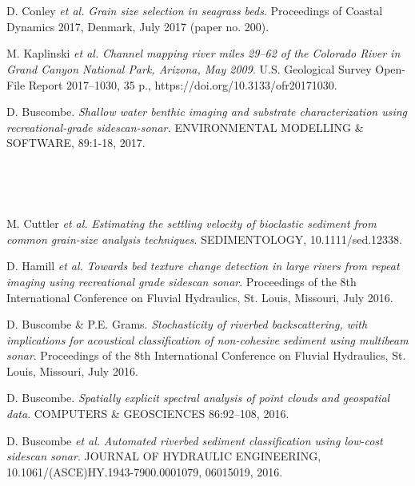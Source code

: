 \documentclass{article} %
\def\sf{\sffamily}
\def\sl{\slshape}
\newlength\sidebarwidth
\newcommand{\subtopic}[3][]
	 {\begin{minipage}{\textwidth}
	 \vspace*{.4\baselineskip}
         \nopagebreak\hspace{0in}%
         \nopagebreak\begin{minipage}[t]{\sidebarwidth - .2cm}
         \raggedleft {\sf\fontseries{sbc}\selectfont #2}
         {\\[-0.2\baselineskip] \textcolor{gray}{\footnotesize #1}}
	 \end{minipage}%
	 \hfill
	 \begin{minipage}[t]{\linewidth - \sidebarwidth}
	 #3%
	 \end{minipage}%
	 \vspace*{.2\baselineskip plus 1\baselineskip minus
	 .2\baselineskip}%
	 \end{minipage}}
\begin{document}
\subtopic{\hspace*{-3ex} 2017}{~
  \begin{itemize}[leftmargin=0ex, itemsep=0ex, parsep=.5ex, labelindent=-4ex]

    \publication
      D. Conley {\sl et al.}
      {\sl Grain size selection in seagrass beds}.
      Proceedings of Coastal Dynamics 2017, Denmark, July 2017 (paper no. 200).

    \publication
      M. Kaplinski {\sl et al.}
      {\sl Channel mapping river miles 29–62 of the Colorado River in Grand Canyon National Park, Arizona, May 2009}.
      U.S. Geological Survey Open-File Report 2017–1030, 35 p., https://doi.org/10.3133/ofr20171030.

    \publication
      D. Buscombe.
      {\sl Shallow water benthic imaging and substrate characterization using recreational-grade sidescan-sonar.}
      ENVIRONMENTAL MODELLING \& SOFTWARE, 89:1-18, 2017.

    \end{itemize}
}


\subtopic{\hspace*{-3ex} 2016}{~
  \begin{itemize}[leftmargin=0ex, itemsep=0ex, parsep=.5ex, labelindent=-4ex]

    \publication
      M. Cuttler {\sl et al.}
      {\sl Estimating the settling velocity of bioclastic sediment from common grain-size analysis techniques}.
      SEDIMENTOLOGY, 10.1111/sed.12338.

    \publication
      D. Hamill {\sl et al.}
      {\sl Towards bed texture change detection in large rivers from repeat imaging using recreational grade sidescan sonar}.
      Proceedings of the 8th International Conference on Fluvial Hydraulics, St. Louis, Missouri, July 2016.

    \publication
      D. Buscombe \& P.E. Grams.
      {\sl Stochasticity of riverbed backscattering, with implications for acoustical classification of non-cohesive sediment using multibeam sonar}.
      Proceedings of the 8th International Conference on Fluvial Hydraulics, St. Louis, Missouri, July 2016.

    \publication
      D. Buscombe.
      {\sl Spatially explicit spectral analysis of point clouds and geospatial data}.
      COMPUTERS \& GEOSCIENCES 86:92--108, 2016.

    \publication
      D. Buscombe {\sl et al.}
      {\sl Automated riverbed sediment classification using low-cost sidescan sonar}.
      JOURNAL OF HYDRAULIC ENGINEERING, 10.1061/(ASCE)HY.1943-7900.0001079, 06015019, 2016.

    \end{itemize}
}
\end{document}
